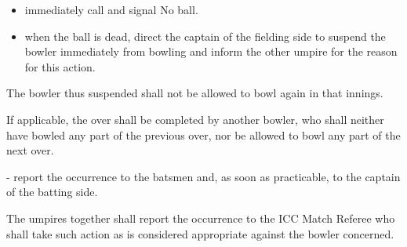 \documentclass[12pt]{article}
\begin{document}
\vspace{\baselineskip}
\begin{itemize}
	\item {\fontsize{9pt}{10.8pt}\selectfont immediately call and signal No ball.\par}\par


\vspace{\baselineskip}
	\item {\fontsize{9pt}{10.8pt}\selectfont when the ball is dead, direct the captain of the fielding side to suspend the bowler immediately from bowling and inform the other umpire for the reason for this action.\par}
\end{itemize}\par


\vspace{\baselineskip}
\begin{adjustwidth}{0.5in}{0.0in}
{\fontsize{9pt}{10.8pt}\selectfont The bowler thus suspended shall not be allowed to bowl again in that innings.\par}\par

\end{adjustwidth}


\vspace{\baselineskip}
\begin{adjustwidth}{0.5in}{0.12in}
{\fontsize{9pt}{10.8pt}\selectfont If applicable, the over shall be completed by another bowler, who shall neither have bowled any part of the previous over, nor be allowed to bowl any part of the next over.\par}\par

\end{adjustwidth}


\vspace{\baselineskip}
\begin{adjustwidth}{0.5in}{0.0in}
{\fontsize{9pt}{10.8pt}\selectfont - report the occurrence to the batsmen and, as soon as practicable, to the captain of the batting side.\par}\par

\end{adjustwidth}


\vspace{\baselineskip}
\begin{adjustwidth}{0.5in}{0.07in}
{\fontsize{9pt}{10.8pt}\selectfont The umpires together shall report the occurrence to the ICC Match Referee who shall take such action as is considered appropriate against the bowler concerned.\par}\par

\end{adjustwidth}
\end{document}
